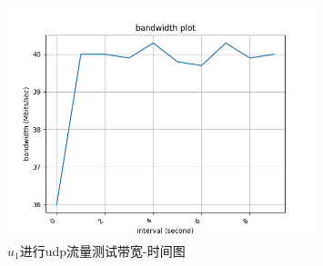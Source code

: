 \begin{figure}[h]
	\centering
	\includegraphics[width=0.8\textwidth]{image/u1.udp.png}
	\caption{$u_1$进行udp流量测试带宽-时间图}
 	\label{fig:topo3}
\end{figure}